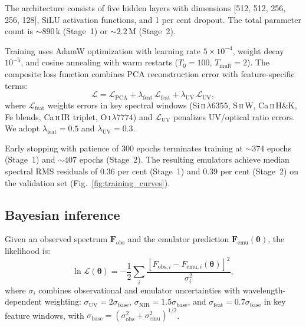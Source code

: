 \documentclass[fleqn,usenatbib]{mnras}
\newcommand{\SiII}{Si\,\textsc{ii}}
\newcommand{\CaII}{Ca\,\textsc{ii}}
\newcommand{\SII}{S\,\textsc{ii}}
\newcommand{\OI}{O\,\textsc{i}}
\begin{document}
The architecture consists of five hidden layers with dimensions [512, 512, 256, 256, 128], SiLU activation functions, and 1 per cent dropout. The total parameter count is ${\sim}890$\,k (Stage~1) or ${\sim}2.2$\,M (Stage~2).

Training uses AdamW optimization with learning rate $5\times10^{-4}$, weight decay $10^{-5}$, and cosine annealing with warm restarts ($T_0 = 100$, $T_\mathrm{mult} = 2$). The composite loss function combines PCA reconstruction error with feature-specific terms:
\begin{equation}
\mathcal{L} = \mathcal{L}_\mathrm{PCA} + \lambda_\mathrm{feat}\, \mathcal{L}_\mathrm{feat} + \lambda_\mathrm{UV}\, \mathcal{L}_\mathrm{UV} ,
\end{equation}
where $\mathcal{L}_\mathrm{feat}$ weights errors in key spectral windows (\SiII{}\,$\lambda 6355$, \SII{}\,W, \CaII{}\,H\&K, Fe blends, \CaII{}\,IR triplet, \OI{}\,$\lambda 7774$) and $\mathcal{L}_\mathrm{UV}$ penalizes UV/optical ratio errors. We adopt $\lambda_\mathrm{feat} = 0.5$ and $\lambda_\mathrm{UV} = 0.3$.

Early stopping with patience of 300 epochs terminates training at ${\sim}374$ epochs (Stage~1) and ${\sim}407$ epochs (Stage~2). The resulting emulators achieve median spectral RMS residuals of 0.36 per cent (Stage~1) and 0.39 per cent (Stage~2) on the validation set (Fig.~\ref{fig:training_curves}).

\subsection{Bayesian inference}
\label{sec:inference}

Given an observed spectrum $\mathbf{F}_\mathrm{obs}$ and the emulator prediction $\mathbf{F}_\mathrm{emu}(\boldsymbol{\theta})$, the likelihood is:
\begin{equation}
\ln \mathcal{L}(\boldsymbol{\theta}) = -\frac{1}{2} \sum_i \frac{[F_{\mathrm{obs},i} - F_{\mathrm{emu},i}(\boldsymbol{\theta})]^2}{\sigma_i^2} ,
\end{equation}
where $\sigma_i$ combines observational and emulator uncertainties with wavelength-dependent weighting: $\sigma_\mathrm{UV} = 2\sigma_\mathrm{base}$, $\sigma_\mathrm{NIR} = 1.5\sigma_\mathrm{base}$, and $\sigma_\mathrm{feat} = 0.7\sigma_\mathrm{base}$ in key feature windows, with $\sigma_\mathrm{base} = (\sigma_\mathrm{obs}^2 + \sigma_\mathrm{emu}^2)^{1/2}$.
\end{document}
